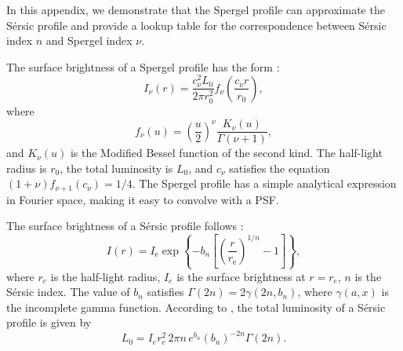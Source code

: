 \documentclass[twocolumn,astrosymb,twocolappendix,linenumbers]{aastex631}
\newcommand{\sersic}{S\'ersic}
\begin{document}
\begin{CJK*}{UTF8}{gbsn}
In this appendix, we demonstrate that the Spergel profile can approximate the \sersic{} profile and provide a lookup table for the correspondence between \sersic{} index $n$ and Spergel index $\nu$.

The surface brightness of a Spergel profile has the form \citep{Spergel2010}:
\begin{equation}
    \label{eq:spergel}
    I_\nu(r) = \frac{c_{\nu}^{2} L_{0}}{2\pi r_{0}^{2}} f_{\nu}\left(\frac{c_{\nu} r}{r_{0}}\right),
\end{equation}
where 
\begin{equation}
    f_{\nu}(u)=\left(\frac{u}{2}\right)^{\nu} \frac{K_{\nu}(u)}{\Gamma(\nu+1)},
\end{equation}
and $K_\nu(u)$ is the Modified Bessel function of the second kind. The half-light radius is $r_0$, the total luminosity is $L_0$, and $c_\nu$ satisfies the equation $(1 + \nu)f_{\nu + 1}(c_\nu) = 1/4$. The Spergel profile has a simple analytical expression in Fourier space, making it easy to convolve with a PSF.

The surface brightness of a \sersic{} profile follows \citep{Sersic1963,Graham2005}:
\begin{equation}\label{eq:sersic}
    I(r)=I_{\mathrm{e}} \exp \left\{-b_{n}\left[\left(\frac{r}{r_{\mathrm{e}}}\right)^{1 / n}-1\right]\right\},
\end{equation}
where $r_e$ is the half-light radius, $I_e$ is the surface brightness at $r=r_e$, $n$ is the \sersic{} index. The value of $b_n$ satisfies $\Gamma(2 n)=2 \gamma\left(2 n, b_{n}\right)$, where $\gamma(a, x)$ is the incomplete gamma function. According to \citet{Graham2005}, the total luminosity of a \sersic{} profile is given by 
\begin{equation}\label{eq:sersic_lum}
    L_0 = I_{e} r_{e}^{2}\, 2 \pi n\, e^{b_{n}} \left(b_{n}\right)^{-2 n} \Gamma(2 n).
\end{equation}


\end{CJK*}
\end{document}
